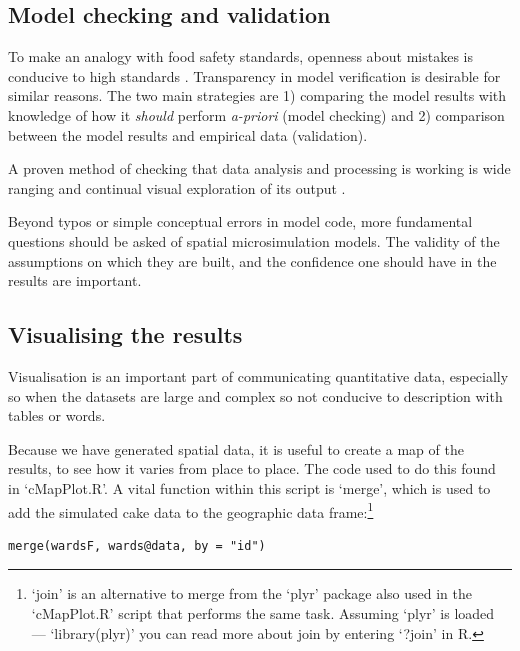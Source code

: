 \documentclass[a4paper, 11pt, twoside]{article}
\begin{document}
\subsection{Model checking and validation}
To make an analogy with food safety standards, openness about mistakes is
conducive to high standards \citep{Powell2011}. Transparency in model
verification is desirable for similar reasons. The two main strategies are 1) 
comparing the model results with knowledge of how it \emph{should}
perform \emph{a-priori} (model checking) and 2) comparison between the model
results and empirical data (validation).

A proven method of checking that data analysis and processing is working
is wide ranging and continual visual exploration of its output
\citep{janert2010data}.

Beyond typos or simple conceptual errors in model code, more fundamental
questions should be asked of spatial microsimulation models. The validity
of the assumptions on which they are built, and the confidence one should have
in the results are important.

\subsection{Visualising the results}
Visualisation is an important part of communicating quantitative
data, especially so when the datasets are large and complex so not
conducive to description with tables or words.

Because we have generated spatial data, it is useful to create 
a map of the results, to see how it varies from place to place.
The code used to do this found in `cMapPlot.R'. A vital function within
this script is `merge', which is used to add the simulated cake data
to the geographic 
data frame:\footnote{`join'
is an alternative to merge from the `plyr' package also used
in the `cMapPlot.R' script that performs the
same task. Assuming `plyr' is loaded --- `library(plyr)' you can read
more about join by entering `?join' in R.}

\begin{lstlisting}[float=h, caption={The merge function for joining
the spatial microsimulation results with geographic data. 
Compare with \cref{finalout}}]
merge(wardsF, wards@data, by = "id")
\end{lstlisting}
\end{document}
